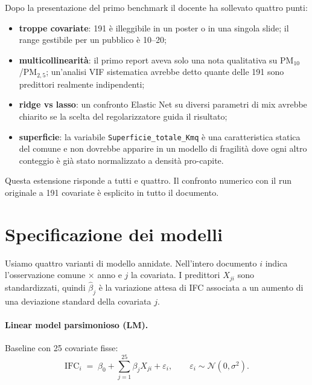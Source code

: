 \documentclass[11pt,a4paper]{article}
\begin{document}
Dopo la presentazione del primo benchmark il docente ha sollevato
quattro punti:
\begin{itemize}[leftmargin=2em]
  \item \textbf{troppe covariate}: 191 \`e illeggibile in un poster o
    in una singola slide; il range gestibile per un pubblico \`e
    10--20;
  \item \textbf{multicollinearit\`a}: il primo report aveva solo una
    nota qualitativa su PM$_{10}$/PM$_{2{,}5}$; un'analisi VIF
    sistematica avrebbe detto quante delle 191 sono predittori
    realmente indipendenti;
  \item \textbf{ridge vs lasso}: un confronto Elastic Net su diversi
    parametri di mix avrebbe chiarito se la scelta del
    regolarizzatore guida il risultato;
  \item \textbf{superficie}: la variabile
    \texttt{Superficie\_totale\_Kmq} \`e una caratteristica statica
    del comune e non dovrebbe apparire in un modello di fragilit\`a
    dove ogni altro conteggio \`e gi\`a stato normalizzato a densit\`a
    pro-capite.
\end{itemize}
Questa estensione risponde a tutti e quattro. Il confronto
numerico con il run originale a 191 covariate \`e esplicito in
tutto il documento.

\section{Specificazione dei modelli}

Usiamo quattro varianti di modello annidate. Nell'intero documento
$i$ indica l'osservazione comune $\times$ anno e $j$ la covariata.
I predittori $X_{ji}$ sono standardizzati, quindi $\hat\beta_j$ \`e
la variazione attesa di IFC associata a un aumento di una
deviazione standard della covariata $j$.

\paragraph{Linear model parsimonioso (LM).}
Baseline con 25 covariate fisse:
\begin{equation}
  \mathrm{IFC}_i \;=\; \beta_0 + \sum_{j=1}^{25} \beta_j X_{ji}
                       + \varepsilon_i,
  \qquad \varepsilon_i \sim \mathcal{N}(0,\sigma^2).
  \label{eq:lm}
\end{equation}
\end{document}
